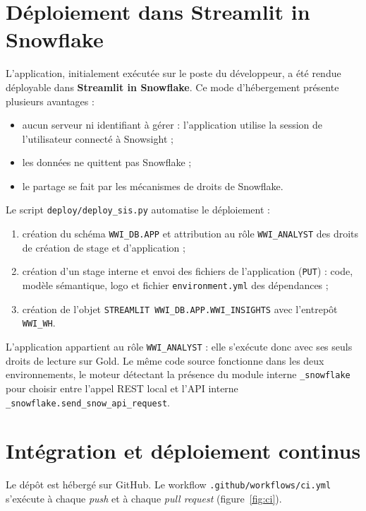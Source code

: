 \section{Déploiement dans Streamlit in Snowflake}

L'application, initialement exécutée sur le poste du développeur, a été rendue déployable dans
\textbf{Streamlit in Snowflake}. Ce mode d'hébergement présente plusieurs avantages :
\begin{itemize}
  \item aucun serveur ni identifiant à gérer : l'application utilise la session de l'utilisateur
        connecté à Snowsight ;
  \item les données ne quittent pas Snowflake ;
  \item le partage se fait par les mécanismes de droits de Snowflake.
\end{itemize}

Le script \texttt{deploy/deploy\_sis.py} automatise le déploiement :
\begin{enumerate}
  \item création du schéma \texttt{WWI\_DB.APP} et attribution au rôle \texttt{WWI\_ANALYST} des droits
        de création de stage et d'application ;
  \item création d'un stage interne et envoi des fichiers de l'application (\texttt{PUT}) : code,
        modèle sémantique, logo et fichier \texttt{environment.yml} des dépendances ;
  \item création de l'objet \texttt{STREAMLIT WWI\_DB.APP.WWI\_INSIGHTS} avec l'entrepôt
        \texttt{WWI\_WH}.
\end{enumerate}

L'application appartient au rôle \texttt{WWI\_ANALYST} : elle s'exécute donc avec ses seuls droits de
lecture sur Gold. Le même code source fonctionne dans les deux environnements, le moteur détectant la
présence du module interne \texttt{\_snowflake} pour choisir entre l'appel REST local et l'API interne
\texttt{\_snowflake.send\_snow\_api\_request}.

\section{Intégration et déploiement continus}

Le dépôt est hébergé sur GitHub. Le workflow \texttt{.github/workflows/ci.yml} s'exécute à chaque
\emph{push} et à chaque \emph{pull request} (figure~\ref{fig:ci}).

